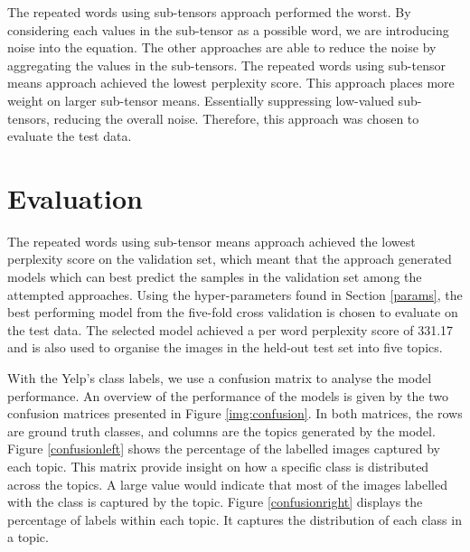 \documentclass{article}
\begin{document}
The repeated words using sub-tensors approach performed the worst. By considering each values in the sub-tensor as a possible word, we are introducing noise into the equation. The other approaches are able to reduce the noise by aggregating the values in the sub-tensors. The repeated words using sub-tensor means approach achieved the lowest perplexity score. This approach places more weight on larger sub-tensor means. Essentially suppressing low-valued sub-tensors, reducing the overall noise. Therefore, this approach was chosen to evaluate the test data. 

\section{Evaluation}
The repeated words using sub-tensor means approach achieved the lowest perplexity score on the validation set, which meant that the approach generated models which can best predict the samples in the validation set among the attempted approaches. Using the hyper-parameters found in Section \ref{params}, the best performing model from the five-fold cross validation is chosen to evaluate on the test data. The selected model achieved a per word perplexity score of 331.17 and is also used to organise the images in the held-out test set into five topics. 

With the Yelp's class labels, we use a confusion matrix to analyse the model performance. An overview of the performance of the models is given by the two confusion matrices presented in Figure \ref{img:confusion}. In both matrices, the rows are ground truth classes, and columns are the topics generated by the model. Figure \ref{confusionleft} shows the percentage of the labelled images captured by each topic. This matrix provide insight on how a specific class is distributed across the topics. A large value would indicate that most of the images labelled with the class is captured by the topic. Figure \ref{confusionright} displays the percentage of labels within each topic. It captures the distribution of each class in a topic.
\end{document}
